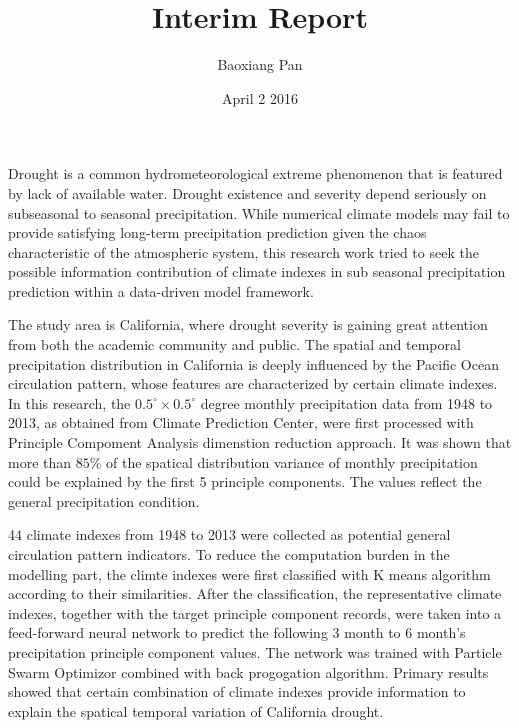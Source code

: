 \documentclass{article}
\title{Interim Report}
\author{Baoxiang Pan}
\date{April 2 2016}
\begin{document}
\maketitle
Drought is a common hydrometeorological extreme phenomenon that is featured by lack of available water. Drought existence and severity depend seriously on subseasonal to seasonal precipitation.  While numerical climate models may fail to provide satisfying long-term precipitation prediction given the chaos characteristic of the atmospheric system\cite{}, this research work tried to seek the possible information contribution of climate indexes in sub seasonal precipitation prediction within a data-driven model framework.

The study area is California, where drought severity is gaining great attention from both the academic community and public\cite{}. The spatial and temporal precipitation distribution in California is deeply influenced by the Pacific Ocean circulation pattern, whose features are characterized by certain climate indexes\cite{}. In this research, the $0.5^{\circ}\times 0.5^{\circ}$ degree monthly precipitation data from 1948 to 2013, as obtained from Climate Prediction Center, were first processed with Principle Compoment Analysis dimenstion reduction approach. It was shown that more than $85\%$ of the spatical distribution variance of monthly precipitation could be explained by the first 5 principle components. The values reflect the general precipitation condition. 

44 climate indexes from 1948 to 2013 were collected as potential general circulation pattern indicators. To reduce the computation burden in the modelling part, the climte indexes were first classified with K means algorithm according to their similarities. After the classification, the representative climate indexes, together with the target principle component records, were taken into a feed-forward neural network to predict the following 3 month to 6 month's precipitation principle component values. The network was trained with Particle Swarm Optimizor\cite{} combined with back progogation algorithm. Primary results showed that certain combination of climate indexes provide information to explain the spatical temporal variation of California drought.
\end{document}

